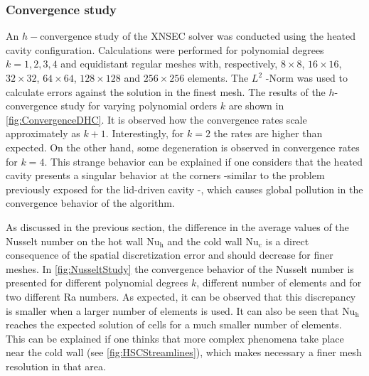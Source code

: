 

\subsubsection{Convergence study}\label{ssec:ConvStudyHeatedCavity}
An $h-$convergence study of the XNSEC solver was conducted using the heated cavity configuration. Calculations were performed for polynomial degrees $k = {1,2,3,4}$ and equidistant regular meshes with, respectively, $8\times8$, $16\times16$, $32\times32$, $64\times64$, $128\times128$ and $256\times256$ elements.  The $L^2$ -Norm was used to calculate errors against the solution in the finest mesh. The results of the $h$-convergence study for varying polynomial orders $k$ are shown in \cref{fig:ConvergenceDHC}. It is observed how the convergence rates scale approximately as $k+1$. Interestingly, for $k=2$ the rates are higher than expected. On the other hand, some degeneration is observed in convergence rates for $k = 4$. This strange behavior can be explained if one considers that the heated cavity presents a singular behavior at the corners %
-similar to the problem previously exposed for the lid-driven cavity -, which causes global pollution in the convergence behavior of the algorithm. %
 
As discussed in the previous section, the difference in the average values of the Nusselt number on the hot wall $\text{Nu}_\text{h}$  and the cold wall $\text{Nu}_\text{c}$ is a direct consequence of the spatial discretization error and should decrease for finer meshes. In \cref{fig:NusseltStudy} the convergence behavior of the Nusselt number is presented for different polynomial degrees $k$, different number of elements and for two different Ra numbers. As expected, it can be observed that this discrepancy is smaller when a larger number of elements is used. It can also be seen that  $\text{Nu}_\text{h}$ reaches the expected solution of cells for a much smaller number of elements. This can be explained if one thinks that more complex phenomena take place near the cold wall (see \cref{fig:HSCStreamlines}), which makes necessary a finer mesh resolution in that area.

